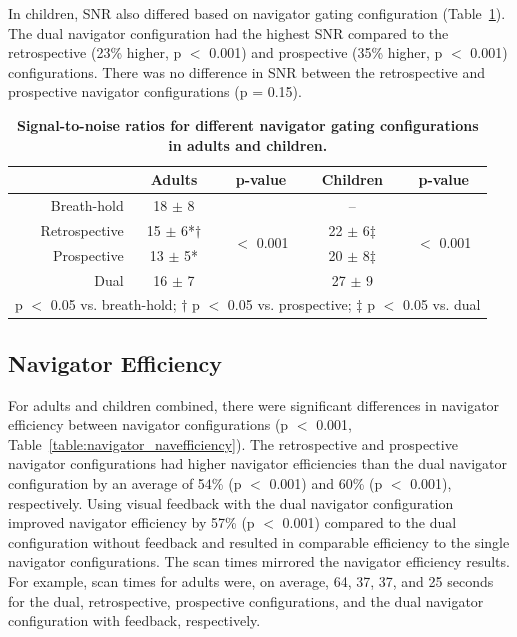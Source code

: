 	In children, SNR also differed based on navigator gating configuration (Table~\ref{table:navigator_snr}). The dual navigator configuration had the highest SNR compared to the retrospective (23\% higher, p $<$ 0.001) and prospective (35\% higher, p $<$ 0.001) configurations. There was no difference in SNR between the retrospective and prospective navigator configurations (p = 0.15).

\begin{table}
	\centering
	\caption[Signal-to-noise ratios for different navigator gating configurations in adults and children]{\textbf{Signal-to-noise ratios for different navigator gating configurations in adults and children.}}
	\label{table:navigator_snr}
	\begin{tabular}{c c c c c}
		\toprule
		\multicolumn{1}{c}{} & \multicolumn{1}{c}{\textbf{Adults}} & \multicolumn{1}{c}{\textbf{p-value}} & \multicolumn{1}{c}{\textbf{Children}} & \multicolumn{1}{c}{\textbf{p-value}} \\ \midrule
		\multicolumn{1}{r}{Breath-hold}      & \multicolumn{1}{c}{18 $\pm$ 8} & \multirow{4}{*}{$<$ 0.001} & \multicolumn{1}{c}{--} & \multirow{4}{*}{$<$ 0.001}     \\
		\multicolumn{1}{r}{Retrospective}    & \multicolumn{1}{c}{15 $\pm$ 6*$\dagger$} & & \multicolumn{1}{c}{22 $\pm$ 6$\ddagger$} &                 \\
		\multicolumn{1}{r}{Prospective}      & \multicolumn{1}{c}{13 $\pm$ 5*} & & \multicolumn{1}{c}{20 $\pm$ 8$\ddagger$} &                 \\
		\multicolumn{1}{r}{Dual}    		 & \multicolumn{1}{c}{16 $\pm$ 7} & & \multicolumn{1}{c}{27 $\pm$ 9} &                 \\
		\bottomrule
		\multicolumn{5}{l}{\footnotesize* p $<$ 0.05 vs. breath-hold; $\dagger$ p $<$ 0.05 vs. prospective; $\ddagger$ p $<$ 0.05 vs. dual} \\
	\end{tabular}
\end{table}

\subsection{Navigator Efficiency}
	For adults and children combined, there were significant differences in navigator efficiency between navigator configurations (p $<$ 0.001, Table~\ref{table:navigator_navefficiency}). The retrospective and prospective navigator configurations had higher navigator efficiencies than the dual navigator configuration by an average of 54\% (p $<$ 0.001) and 60\% (p $<$ 0.001), respectively. Using visual feedback with the dual navigator configuration improved navigator efficiency by 57\% (p $<$ 0.001) compared to the dual configuration without feedback and resulted in comparable efficiency to the single navigator configurations. The scan times mirrored the navigator efficiency results. For example, scan times for adults were, on average, 64, 37, 37, and 25 seconds for the dual, retrospective, prospective configurations, and the dual navigator configuration with feedback, respectively.

